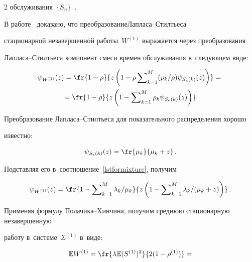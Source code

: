 \begin{multicols}{2}
обслуживания~$\{S_n\}$~\cite{Asmus}.





В работе~\cite{mathematics2022} доказано, что преобразование\linebreak Лап\-ла\-са--Стилть\-еса 


стационарной незавершенной работы~$W^{(1)}$ выражается через преобразования 


Лап\-ла\-са--Стилть\-еса компонент смеси времен обслуживания в~сле\-ду\-ющем виде:


\begin{multline}


\label{lstformixture}


\psi_{W^{(1)}}(z)=\fr{1-\rho}{z\left(1-\rho\sum\nolimits_{k=1}^M 


(\rho_k/{\rho}) \psi_{S_e(k)}(z)\right)}={}\\


{}=\fr{1-\rho}{z\left(1-


\sum\nolimits_{k=1}^M \rho_k \psi_{S_e(k)}(z)\right)}.


\end{multline}





Преобразование Лапласа--Стилть\-еса для показательного распределения хорошо 


известно: 


$$


\psi_{S_e(k)}(z) = \fr{\mu_k}{\mu_k +z}\,.


$$ 


Подставляя его в~соотношение~\eqref{lstformixture},  получим


$$


\psi_{W^{(1)}}(z)=\fr{1-\sum\nolimits_{k=1}^M \lambda_k/\mu_k}{z\left(1-


\sum\nolimits_{k=1}^M  {\lambda_k}/(\mu_k +z)   


\right)}\,.


$$





Применяя формулу По\-ла\-чи\-ка--Хин\-чи\-на, получим среднюю стационарную незавершенную 


работу  в~сис\-те\-ме~$\Sigma^{(1)}$ в~виде:


\begin{equation}


\label{ew5}


\mathbb{E}  W^{(1)} = \fr{\lambda \mathbb{E} ( S^{(1)})^2}{2(1-\rho^{(1)})} = 



\end{equation}
\end{multicols}
